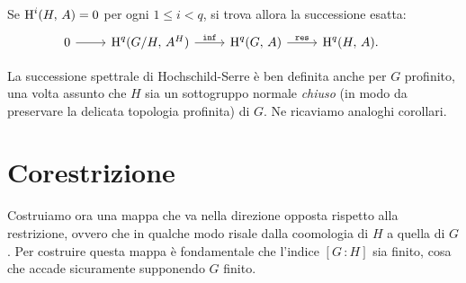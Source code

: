 \begin{corollary}\label{boo2}
	Se $ \operatorname{H}^i(H, \, A ) = 0 $ per ogni $ 1 \leq i < q $, si trova allora la successione esatta:
	\[\begin{tikzcd}
	0 \rar & \HH^q(G/H, \, A^H) \rar["\Inf"]
	& \HH^q(G, \, A) \rar["\Res"]
	& \HH^q(H, \, A).
	\end{tikzcd} \qquad  \]
\end{corollary}

\begin{profinite}
	La successione spettrale di Hochschild-Serre è ben definita anche per $ G $ profinito, una volta assunto che $ H $ sia un sottogruppo normale \emph{chiuso} (in modo da preservare la delicata topologia profinita) di $ G $. Ne ricaviamo analoghi corollari.
\end{profinite}


\section{Corestrizione}
Costruiamo ora una mappa che va nella direzione opposta rispetto alla restrizione, ovvero che in qualche modo risale dalla coomologia di $ H $ a quella di $ G $. Per costruire questa mappa è fondamentale che l'indice $ [G \, \colon H] $ sia finito, cosa che accade sicuramente supponendo $ G $ finito.

